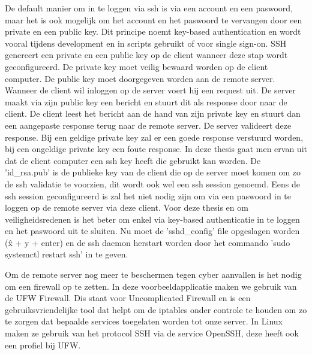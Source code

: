             De default manier om in te loggen via ssh is via een account en een paswoord, maar het is ook mogelijk om het account en het paswoord te vervangen door een private en een public key. Dit principe noemt key-based authentication en wordt vooral tijdens development en in scripts gebruikt of voor single sign-on. SSH genereert een private en een public key op de client wanneer deze stap wordt geconfigureerd. De private key moet veilig bewaard worden op de client computer. De public key moet doorgegeven worden aan de remote server. Wanneer de client wil inloggen op de server voert hij een request uit. De server maakt via zijn public key een bericht en stuurt dit als response door naar de client. De client leest het bericht aan de hand van zijn private key en stuurt dan een aangepaste response terug naar de remote server. De server valideert deze response. Bij een geldige private key zal er een goede response verstuurd worden, bij een ongeldige private key een foute response.
            In deze thesis gaat men ervan uit dat de client computer een ssh key heeft die gebruikt kan worden. %
            De 'id\_rsa.pub' is de publieke key van de client die op de server moet komen om zo de ssh validatie te voorzien, dit wordt ook wel een ssh session genoemd. Eens de ssh session geconfigureerd is zal het niet nodig zijn om via een paswoord in te loggen op de remote server via deze client.
            Voor deze thesis en om veiligheidsredenen is het beter om enkel via key-based authenticatie in te loggen en het paswoord uit te sluiten.
            Nu moet de 'sshd\_config' file opgeslagen worden (\^x + y + enter) en de ssh daemon herstart worden door het commando 'sudo systemctl restart ssh' in te geven.
            
            Om de remote server nog meer te beschermen tegen cyber aanvallen is het nodig om een firewall op te zetten. In deze voorbeeldapplicatie maken we gebruik van de UFW Firewall. Dis staat voor Uncomplicated Firewall en is een gebruiksvriendelijke tool dat helpt om de iptables onder controle te houden om zo te zorgen dat bepaalde services toegelaten worden tot onze server.
            In Linux maken ze gebruik van het protocol SSH via de service OpenSSH, deze heeft ook een profiel bij UFW.
            
